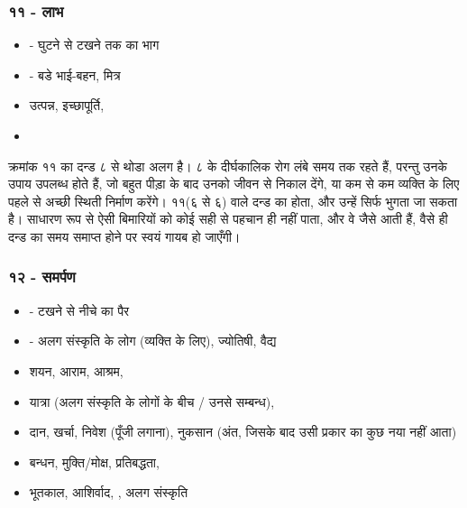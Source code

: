 \subsubsection{११ - लाभ}
\begin{itemize}
    \item {} - घुटने से टखने तक का भाग
    \item {} - बडे भाई-बहन, मित्र
    \item उत्पन्न, इच्छापूर्ति, 
    \item {}
\end{itemize}
क्रमांक ११ का दन्ड ८ से थोडा अलग है। ८ के दीर्घकालिक रोग  लंबे समय तक रहते हैं, परन्तु उनके उपाय उपलब्ध होते हैं, जो  बहुत पीड़ा के बाद उनको जीवन से निकाल देंगे, या कम से कम व्यक्ति के लिए पहले से अच्छी स्थिती निर्माण करेंगे। ११(६ से ६) वाले दन्ड का  होता, और उन्हें सिर्फ भुगता जा सकता है। साधारण रूप से ऐसी बिमारियों को कोई सही से पहचान ही नहीं पाता, और वे जैसे आती हैं, वैसे ही दन्ड का समय समाप्त होने पर स्वयं गायब हो जाएँगी।
\subsubsection{१२ - समर्पण}
\begin{itemize}
    \item {} - टखने से नीचे का पैर
    \item {} - अलग संस्कृति के लोग (व्यक्ति के लिए), ज्योतिषी, वैद्य
    \item शयन, आराम, आश्रम, 
    \item यात्रा (अलग संस्कृति के लोगों के बीच / उनसे सम्बन्ध), 
    \item दान, खर्चा, निवेश (पूँजी लगाना), नुकसान (अंत, जिसके बाद उसी प्रकार का कुछ नया नहीं आता)
    \item बन्धन, मुक्ति/मोक्ष, प्रतिबद्धता, 
    \item भूतकाल, आशिर्वाद, , अलग संस्कृति
\end{itemize}

